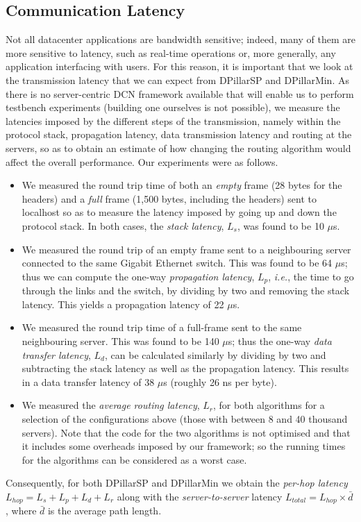 \documentclass{article}
\newcounter{fig}
\begin{document}
\subsection{Communication Latency} \label{sec:latency}
Not all datacenter applications are bandwidth sensitive; indeed, many of them are more sensitive to latency, such as real-time operations or, more generally, any application interfacing with users. For this reason, it is important that we look at the transmission latency that we can expect from DPillarSP and DPillarMin. As there is no server-centric DCN framework available that will enable us to perform testbench experiments (building one ourselves is not possible), we measure the latencies imposed by the different steps of the transmission, namely within the protocol stack, propagation latency, data transmission latency and routing at the servers, so as to obtain an estimate of how changing the routing algorithm would affect the overall performance. Our experiments were as follows.

\begin{itemize}
	\item We measured the round trip time of both an \emph{empty} frame (28 bytes for the headers) and a \emph{full} frame (1,500 bytes, including the headers) sent to localhost so as to measure the latency imposed by going up and down the protocol stack. In both cases, the \emph{stack latency}, $L_{s}$, was found to be 10 $\mu$s.
	\item We measured the round trip of an empty frame sent to a neighbouring server connected to the same Gigabit Ethernet switch. This was found to be 64 $\mu$s; thus we can compute the one-way \emph{propagation latency}, $L_p$, \emph{i.e.}, the time to go through the links and the switch, by dividing by two and removing the stack latency. This yields a propagation latency of 22 $\mu$s.
	\item We measured the round trip time of a full-frame sent to the same neighbouring server. This was found to be 140 $\mu$s; thus the one-way \emph{data transfer latency}, $L_{d}$, can be calculated similarly by dividing by two and subtracting the stack latency as well as the propagation latency. This results in a data transfer latency of 38 $\mu$s (roughly 26 ns per byte).
	\item We measured the \emph{average routing latency}, $L_{r}$, for both algorithms for a selection of the configurations above (those with between 8 and 40 thousand servers). Note that the code for the two algorithms is not optimised and that it includes some overheads imposed by our framework; so the running times for the algorithms can be considered as a worst case. 
\end{itemize}
Consequently, for both DPillarSP and DPillarMin we obtain the \emph{per-hop latency} $L_{hop} = L_s + L_p + L_d + L_r$ along with the \emph{server-to-server} latency $L_{total} = L_{hop}\times \bar{d}$, where $\bar{d}$ is the average path length.
\end{document}
